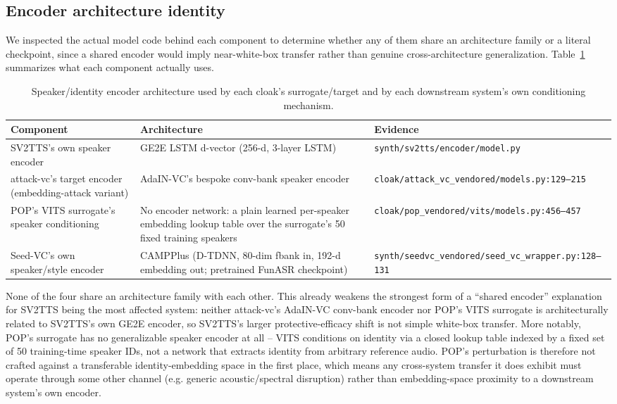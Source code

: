 \documentclass[11pt]{article}
\begin{document}
\subsection{Encoder architecture identity}
\label{sec:ablation-encoder-lineage}
We inspected the actual model code behind each component to determine
whether any of them share an architecture family or a literal
checkpoint, since a shared encoder would imply near-white-box transfer
rather than genuine cross-architecture generalization.
Table~\ref{tab:encoder-lineage} summarizes what each component actually
uses.

\begin{table}[H]
\centering
\caption{Speaker/identity encoder architecture used by each cloak's
surrogate/target and by each downstream system's own conditioning
mechanism.}
\label{tab:encoder-lineage}
\begin{tabular}{p{3.4cm}p{4.4cm}p{5.6cm}}
\toprule
Component & Architecture & Evidence \\
\midrule
SV2TTS's own speaker encoder & GE2E LSTM d-vector (256-d, 3-layer LSTM) & \texttt{synth/sv2tts/encoder/model.py} \\
attack-vc's target encoder (embedding-attack variant) & AdaIN-VC's bespoke conv-bank speaker encoder & \texttt{cloak/attack\_vc\_vendored/models.py:129--215} \\
POP's VITS surrogate's speaker conditioning & No encoder network: a plain learned per-speaker embedding lookup table over the surrogate's 50 fixed training speakers & \texttt{cloak/pop\_vendored/vits/models.py:456--457} \\
Seed-VC's own speaker/style encoder & CAMPPlus (D-TDNN, 80-dim fbank in, 192-d embedding out; pretrained FunASR checkpoint) & \texttt{synth/seedvc\_vendored/seed\_vc\_wrapper.py:128--131} \\
\bottomrule
\end{tabular}
\end{table}

None of the four share an architecture family with each other. This
already weakens the strongest form of a ``shared encoder'' explanation
for SV2TTS being the most affected system: neither attack-vc's AdaIN-VC
conv-bank encoder nor POP's VITS surrogate is architecturally related
to SV2TTS's own GE2E encoder, so SV2TTS's larger protective-efficacy
shift is not simple white-box transfer. More notably, POP's surrogate
has no generalizable speaker encoder at all -- VITS conditions on
identity via a closed lookup table indexed by a fixed set of 50
training-time speaker IDs, not a network that extracts identity from
arbitrary reference audio. POP's perturbation is therefore not crafted
against a transferable identity-embedding space in the first place,
which means any cross-system transfer it does exhibit must operate
through some other channel (e.g. generic acoustic/spectral disruption)
rather than embedding-space proximity to a downstream system's own
encoder.
\end{document}
